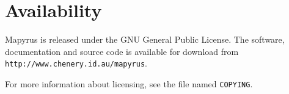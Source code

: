 
\section{Availability}

Mapyrus is released under the GNU General Public License.
The software, documentation and source code is available for download
from \\
\texttt{http://www.chenery.id.au/mapyrus}.

For more information about licensing, see the file named \texttt{COPYING}.

